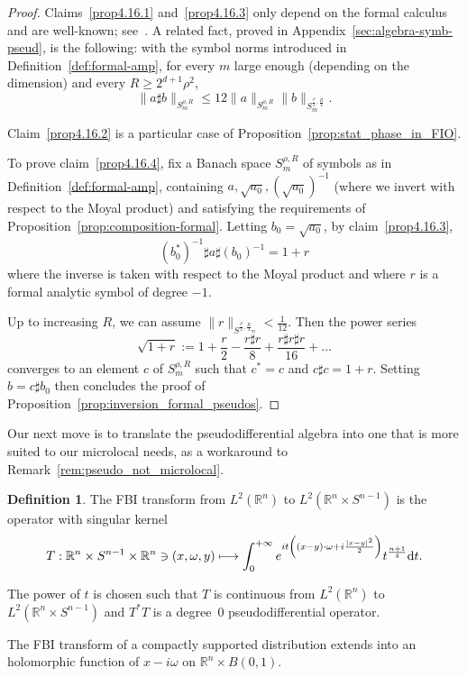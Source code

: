 \documentclass[10pt]{amsart}
\theoremstyle{definition}\newtheorem{defi}[theo]{Definition}\newtheorem{rema}[theo]{Remark}\newtheorem{exam}[theo]{Example}\newtheorem{exem}[theo]{Example}\newtheorem{nota}[theo]{Notation}
\newcommand\1{\mathds{1}}
\newcommand{\R}{\mathbb{R}}
\newcommand{\dd}{\mathrm{d}}
\let\oldmapsto\mapsto
\renewcommand*{\mapsto}{\mathchoice{\longmapsto}{\oldmapsto}{\oldmapsto}{\oldmapsto}}
\let\originalleft\left
\let\originalright\right
\renewcommand{\left}{\mathopen{}\mathclose\bgroup\originalleft}
\renewcommand{\right}{\aftergroup\egroup\originalright}
\begin{document}
\begin{proof}
Claims~\eqref{prop4.16.1} and~\eqref{prop4.16.3} only depend on the formal calculus and are well-known; see~\cite{sjostrand_singularites_1982}. A related fact, proved in Appendix~\ref{sec:algebra-symb-pseud}, is the following: with the symbol norms introduced in Definition~\ref{def:formal-amp}, for every $m$ large enough (depending on the dimension) and every $R\geq 2^{d+1}\rho^2$,
\[
\|a\sharp b\|_{S_m^{\rho,R}}\leq 12\|a\|_{S_m^{\rho,R}}\|b\|_{S_m^{\frac{\rho}{2},\frac{R}{4}}}.
\]

Claim~\eqref{prop4.16.2} is a particular case of Proposition~\ref{prop:stat_phase_in_FIO}.

To prove claim~\eqref{prop4.16.4}, fix a Banach space $S^{\rho,R}_m$ of symbols as in Definition~\ref{def:formal-amp}, containing $a,\sqrt{a_0},(\sqrt{a_0})^{-1}$ (where we invert with respect to the Moyal product) and satisfying the requirements of Proposition~\ref{prop:composition-formal}. Letting $b_0=\sqrt{a_0}$, by claim~\eqref{prop4.16.3},
\[
(b_0^*)^{-1}\sharp a\sharp (b_0)^{-1}=1+r
\]
where the inverse is taken with respect to the Moyal product and where $r$ is a formal analytic symbol of degree $-1$.

Up to increasing $R$, we can assume $\|r\|_{S^{\frac{\rho}{2},\frac{R}{4}_m}}<\frac{1}{12}$. Then the power series
\[
\sqrt{1+r}:=1+\frac{r}{2}-\frac{r\sharp r}{8}+\frac{r\sharp r
\sharp r}{16}+\dots
\]
converges to an element $c$ of $S^{\rho,R}_m$ such that $c^*=c$ and $c\sharp c = 1+r$. Setting $b=c\sharp b_0$ then concludes the proof of Proposition~\ref{prop:inversion_formal_pseudos}.
\end{proof}

Our next move is to translate the pseudodifferential algebra into one that is more suited to our microlocal needs, as a workaround to Remark~\ref{rem:pseudo_not_microlocal}.

\begin{defi}\label{def:FBI}
The FBI transform from $L^2(\R^n)$ to $L^2(\R^n\times S^{n-1})$ is the operator with singular kernel
\[
T:\R^n\times S^{n-1}\times \R^n\ni (x,\omega,y)\mapsto \int_0^{+\infty} e^{it\left((x-y)\cdot
\omega+i\frac{|x-y|^2}{2}\right)}t^{\frac{n+1}{4}}\dd t.
\]
\end{defi} The power of $t$ is chosen such that $T$ is continuous from $L^2(\R^n)$ to $L^2(\R^n\times S^{n-1})$ and $T^*T$ is a degree~$0$ pseudodifferential operator.

\begin{prop}\label{prop:FBI_holom_ext}
The FBI transform of a compactly supported distribution extends into an holomorphic function of $x-i\omega$ on $\R^n\times B(0,1)$.
\end{prop}
\end{document}
